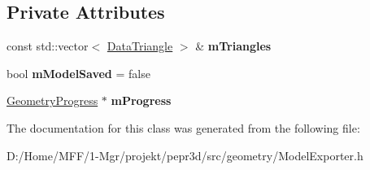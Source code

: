 \subsection*{Private Attributes}
\begin{DoxyCompactItemize}
\item 
\mbox{\label{classpepr3d_1_1_model_exporter_acb68efa3b6583d810be4c2e8f0a20c83}} 
const std\+::vector$<$ \mbox{\hyperlink{classpepr3d_1_1_data_triangle}{Data\+Triangle}} $>$ \& {\bfseries m\+Triangles}
\item 
\mbox{\label{classpepr3d_1_1_model_exporter_abba8610307219c1fa23f2061846925a3}} 
bool {\bfseries m\+Model\+Saved} = false
\item 
\mbox{\label{classpepr3d_1_1_model_exporter_a618a0accacf4026df647364d4843049f}} 
\mbox{\hyperlink{structpepr3d_1_1_geometry_progress}{Geometry\+Progress}} $\ast$ {\bfseries m\+Progress}
\end{DoxyCompactItemize}


The documentation for this class was generated from the following file\+:\begin{DoxyCompactItemize}
\item 
D\+:/\+Home/\+M\+F\+F/1-\/\+Mgr/projekt/pepr3d/src/geometry/Model\+Exporter.\+h\end{DoxyCompactItemize}

